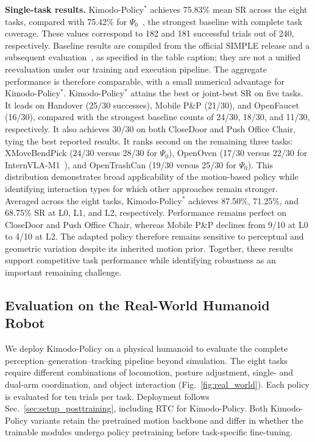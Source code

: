 

\textbf{Single-task results.} Kimodo-Policy$^{*}$ achieves 75.83\% mean SR across the eight tasks, compared with 75.42\% for $\Psi_0$~\citep{psi0}, the strongest baseline with complete task coverage. These values correspond to 182 and 181 successful trials out of 240, respectively. Baseline results are compiled from the official SIMPLE release and a subsequent evaluation~\citep{simple,chen2026memorybeforegoal}, as specified in the table caption; they are not a unified reevaluation under our training and execution pipeline. The aggregate performance is therefore comparable, with a small numerical advantage for Kimodo-Policy$^{*}$. Kimodo-Policy$^{*}$ attains the best or joint-best SR on five tasks. It leads on Handover (25/30 successes), Mobile P\&P (21/30), and OpenFaucet (16/30), compared with the strongest baseline counts of 24/30, 18/30, and 11/30, respectively. It also achieves 30/30 on both CloseDoor and Push Office Chair, tying the best reported results. It ranks second on the remaining three tasks: XMoveBendPick (24/30 versus 28/30 for $\Psi_0$), OpenOven (17/30 versus 22/30 for InternVLA-M1~\citep{internvla_m1}), and OpenTrashCan (19/30 versus 25/30 for $\Psi_0$). This distribution demonstrates broad applicability of the motion-based policy while identifying interaction types for which other approaches remain stronger. Averaged across the eight tasks, Kimodo-Policy$^{*}$ achieves 87.50\%, 71.25\%, and 68.75\% SR at L0, L1, and L2, respectively. Performance remains perfect on CloseDoor and Push Office Chair, whereas Mobile P\&P declines from 9/10 at L0 to 4/10 at L2. The adapted policy therefore remains sensitive to perceptual and geometric variation despite its inherited motion prior. Together, these results support competitive task performance while identifying robustness as an important remaining challenge.

\subsection{Evaluation on the Real-World Humanoid Robot}
\label{sec:exp_real}

We deploy Kimodo-Policy on a physical humanoid to evaluate the complete perception--generation--tracking pipeline beyond simulation. The eight tasks require different combinations of locomotion, posture adjustment, single- and dual-arm coordination, and object interaction (Fig.~\ref{fig:real_world}). Each policy is evaluated for ten trials per task. Deployment follows Sec.~\ref{sec:setup_posttraining}, including RTC for Kimodo-Policy. Both Kimodo-Policy variants retain the pretrained motion backbone and differ in whether the trainable modules undergo policy pretraining before task-specific fine-tuning.

